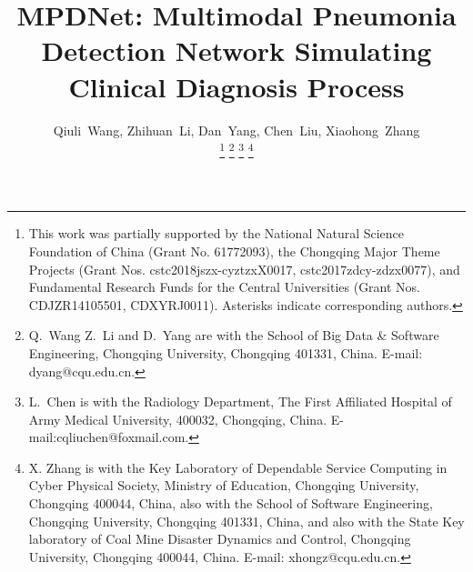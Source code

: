 \documentclass[journal]{IEEEtran}
\begin{document}
%
\title{MPDNet: Multimodal Pneumonia Detection Network Simulating Clinical Diagnosis Process}
%
%
%

\author{Qiuli~Wang,
        Zhihuan~Li,
        Dan~Yang,
        Chen~Liu,
        Xiaohong~Zhang%

\thanks{This work was partially supported by the National Natural Science Foundation of China (Grant No. 61772093), the Chongqing Major Theme Projects (Grant Nos. cstc2018jszx-cyztzxX0017, cstc2017zdcy-zdzx0077), and Fundamental Research Funds for the Central Universities (Grant Nos. CDJZR14105501, CDXYRJ0011). Asterisks indicate corresponding authors.
}
\thanks{Q.~Wang Z.~Li and D.~Yang are with the School of Big Data \& Software Engineering, Chongqing University, Chongqing 401331, China. E-mail: dyang@cqu.edu.cn.}
\thanks{L.~Chen is with the Radiology Department, The First Affiliated Hospital of Army Medical University, 400032, Chongqing, China. E-mail:cqliuchen@foxmail.com. }
\thanks{X. Zhang is with the Key Laboratory of Dependable Service Computing in Cyber Physical Society, Ministry of Education, Chongqing University, Chongqing 400044, China, also with the School of Software Engineering, Chongqing University, Chongqing 401331, China, and also with the State Key laboratory of Coal Mine Disaster Dynamics and Control, Chongqing University, Chongqing 400044, China. E-mail: xhongz@cqu.edu.cn.}

}
\end{document}
